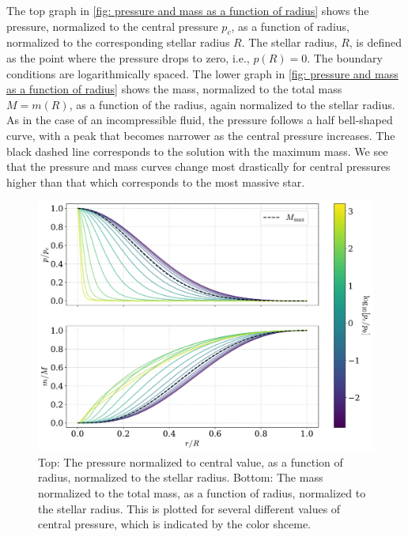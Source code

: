 The top graph in \autoref{fig: pressure and mass as a function of radius} shows the pressure, normalized to the central pressure $p_c$, as a function of radius, normalized to the corresponding stellar radius $R$.
The stellar radius, $R$, is defined as the point where the pressure drops to zero, i.e., $p(R) = 0$.
The boundary conditions are logarithmically spaced.
The lower graph in \autoref{fig: pressure and mass as a function of radius} shows the mass, normalized to the total mass $M = m(R)$, as a function of the radius, again normalized to the stellar radius.
As in the case of an incompressible fluid, the pressure follows a half bell-shaped curve, with a peak that becomes narrower as the central pressure increases.
The black dashed line corresponds to the solution with the maximum mass.
We see that the pressure and mass curves change most drastically for central pressures higher than that which corresponds to the most massive star.

\begin{figure}[h]
    \centering
    \includegraphics[width=\textwidth]{../scripts/figurer/pressure_mass.pdf}
    \caption{
        Top: The pressure normalized to central value, as a function of radius, normalized to the stellar radius.
        Bottom: The mass normalized to the total mass, as a function of radius, normalized to the stellar radius. 
        This is plotted for several different values of central pressure, which is indicated by the color shceme.
        }
    \label{fig: pressure and mass as a function of radius}
\end{figure}


